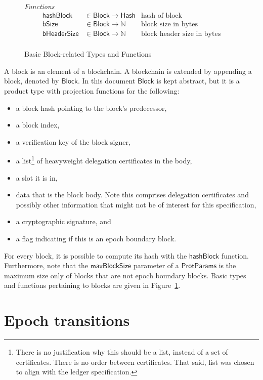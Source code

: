 \documentclass[11pt,a4paper]{article}
\newcommand{\fun}[1]{\mathsf{#1}}
\newcommand{\type}[1]{\mathsf{#1}}
\newcommand{\Hash}{\type{Hash}}  %
\newcommand{\Block}{\type{Block}}
\newcommand{\ProtParams}{\type{ProtParams}} %
\newcommand{\bsizename}{bSize}
\newcommand{\bhdrsizename}{bHeaderSize}
\newcommand{\hashofblockname}{hashBlock}
\newcommand{\maxblocksizename}{maxBlockSize}
\newcommand{\totalf}{\to}
\begin{document}
\begin{figure}
\begin{align*}
  \end{align*}
  \emph{Functions}
  \begin{align*}
    \fun{\hashofblockname} & \in \Block \totalf \Hash & \text{hash of block} \\
    \fun{\bsizename} & \in \Block \totalf \mathbb{N} & \text{block size in bytes} \\
    \fun{\bhdrsizename} & \in \Block \totalf \mathbb{N}
      & \text{block header size in bytes}\\
  \end{align*}
  \caption{Basic Block-related Types and Functions}
  \label{fig:block-defs}
\end{figure}


A block is an element of a blockchain.
%
A blockchain is extended by appending a block, denoted by $\Block$.
%
In this document $\Block$ is kept abstract, but it is a product type with
projection functions for the following:
%
\begin{itemize}
\item a block hash pointing to the block's predecessor,
\item a block index,
\item a verification key of the block signer,
\item a list\footnote{There is no justification why this should be a list,
    instead of a set of certificates. There is no order between
    certificates. That said, list was chosen to align with the ledger
    specification.} of heavyweight delegation certificates in the body,
\item a slot it is in,
\item data that is the block body. Note this comprises delegation certificates
  and possibly other information that might not be of interest for this
  specification,
\item a cryptographic signature, and
\item a flag indicating if this is an epoch boundary block.
\end{itemize}


For every block, it is possible to compute its hash with the
$\fun{\hashofblockname}$ function.
%
Furthermore, note that the $\fun{\maxblocksizename}$ parameter of a
$\ProtParams$ is the maximum size only of blocks that are not epoch boundary
blocks.
%
Basic types and functions pertaining to blocks are given in
Figure~\ref{fig:block-defs}.

\section{Epoch transitions}
\end{document}
